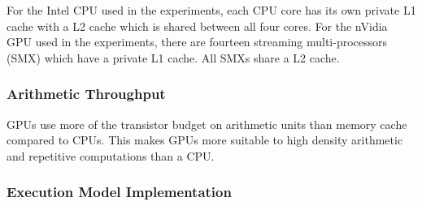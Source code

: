 For the Intel CPU used in the experiments, each CPU core has its own private L1
cache with a L2 cache which is shared between all four cores. For the nVidia GPU
used in the experiments, there are fourteen streaming multi-processors (SMX)
which have a private L1 cache. All SMXs share a L2 cache.

\subsubsection{Arithmetic Throughput}

GPUs use more of the transistor budget on arithmetic units than memory cache
compared to CPUs. This makes GPUs more suitable to high density arithmetic and
repetitive computations than a CPU.

%
%
%
%

\subsubsection{Execution Model Implementation}

